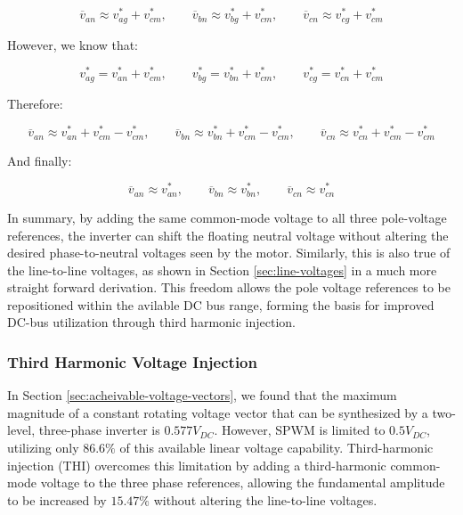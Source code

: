 \documentclass{article}
\begin{document}
\begin{equation}
    \overline{v}_{an} \approx v_{ag}^* + v_{cm}^*, \qquad
    \overline{v}_{bn} \approx v_{bg}^* + v_{cm}^*, \qquad
    \overline{v}_{cn} \approx v_{cg}^* + v_{cm}^*
\end{equation}

However, we know that:

\begin{equation}
    v_{ag}^* = v_{an}^* + v_{cm}^*, \qquad
    v_{bg}^* = v_{bn}^* + v_{cm}^*, \qquad
    v_{cg}^* = v_{cn}^* + v_{cm}^*
\end{equation}

Therefore:

\begin{equation}
    \overline{v}_{an} \approx v_{an}^* + v_{cm}^* - v_{cm}^*, \qquad
    \overline{v}_{bn} \approx v_{bn}^* + v_{cm}^* - v_{cm}^*, \qquad
    \overline{v}_{cn} \approx v_{cn}^* + v_{cm}^* - v_{cm}^*
\end{equation}

And finally:

\begin{equation}
    \overline{v}_{an} \approx v_{an}^*, \qquad
    \overline{v}_{bn} \approx v_{bn}^*, \qquad
    \overline{v}_{cn} \approx v_{cn}^*
\end{equation}

In summary, by adding the same common-mode voltage to all three pole-voltage references, the inverter can shift the floating neutral voltage without altering the desired phase-to-neutral voltages seen by the motor. Similarly, this is also true of the line-to-line voltages, as shown in Section \ref{sec:line-voltages} in a much more straight forward derivation. This freedom allows the pole voltage references to be repositioned within the avilable DC bus range, forming the basis for improved DC-bus utilization through third harmonic injection.


\subsubsection{Third Harmonic Voltage Injection}
\label{sec:third-harmonic-voltage-injection}

In Section \ref{sec:acheivable-voltage-vectors}, we found that the maximum magnitude of a constant rotating voltage vector that can be synthesized by a two-level, three-phase inverter is $0.577V_{DC}$. However, SPWM is limited to $0.5V_{DC}$, utilizing only $86.6\%$ of this available linear voltage capability. Third-harmonic injection (THI) overcomes this limitation by adding a third-harmonic common-mode voltage to the three phase references, allowing the fundamental amplitude to be increased by $15.47\%$ without altering the line-to-line voltages.
\end{document}

